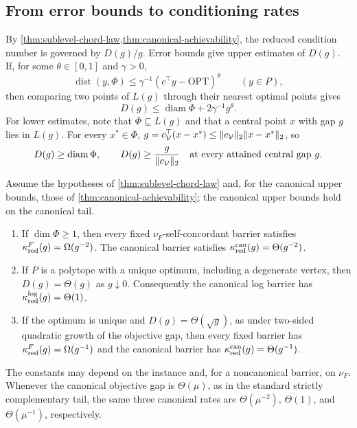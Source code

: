 \subsection{From error bounds to conditioning rates}
\label{sec:conditioning-dictionary}

By \cref{thm:sublevel-chord-law,thm:canonical-achievability}, the reduced
condition number is governed by $D(g)/g$.  Error bounds give upper estimates
of $D(g)$.  If, for some $\theta\in[0,1]$ and $\gamma>0$,
\begin{equation}
 \operatorname{dist}(y,\Phi)\leq\gamma^{-1}
       (c^\top y-\mathrm{OPT})^\theta\qquad(y\in P),
 \label{eq:holder-error-bound}
\end{equation}
then comparing two points of $L(g)$ through their nearest optimal points
gives
\begin{equation}
 D(g)\leq\operatorname{diam}\Phi+2\gamma^{-1}g^\theta.
 \label{eq:diameter-from-error-bound}
\end{equation}
For lower estimates, note that $\Phi\subseteq L(g)$ and that a central
point $x$ with gap $g$ lies in $L(g)$.  For every $x^*\in\Phi$,
$g=c_{\mathcal V}^\top(x-x^*)\leq
\lVert c_{\mathcal V}\rVert_2\lVert x-x^*\rVert_2$, so
\begin{equation}
 D(g)\geq\operatorname{diam}\Phi,
 \qquad
 D(g)\geq\frac g{\lVert c_{\mathcal V}\rVert_2}
 \quad\text{at every attained central gap }g.
 \label{eq:diameter-lower-basics}
\end{equation}

\begin{corollary}
\label{cor:conditioning-regimes}
Assume the hypotheses of \cref{thm:sublevel-chord-law} and, for the
canonical upper bounds, those of \cref{thm:canonical-achievability}; the
canonical upper bounds hold on the canonical tail.
\begin{enumerate}[label=\textup{(\roman*)}]
 \item If $\dim\Phi\geq1$, then every fixed $\nu_F$-self-concordant barrier
 satisfies $\kappa_{\rm red}^{F}(g)=\Omega(g^{-2})$.  The canonical barrier
 satisfies $\kappa_{\rm red}^{\rm can}(g)=\Theta(g^{-2})$.
 \item If $P$ is a polytope with a unique optimum, including a degenerate
 vertex, then $D(g)=\Theta(g)$ as $g\downarrow0$.  Consequently the canonical
 log barrier has $\kappa_{\rm red}^{\log}(g)=\Theta(1)$.
 \item If the optimum is unique and $D(g)=\Theta(\sqrt g)$, as under two-sided
 quadratic growth of the objective gap, then every fixed barrier has
 $\kappa_{\rm red}^{F}(g)=\Omega(g^{-1})$ and the canonical barrier has
 $\kappa_{\rm red}^{\rm can}(g)=\Theta(g^{-1})$.
\end{enumerate}
The constants may depend on the instance and, for a noncanonical barrier, on
$\nu_F$.  Whenever the canonical objective gap is $\Theta(\mu)$, as in the
standard strictly complementary tail, the same three canonical rates are
$\Theta(\mu^{-2})$, $\Theta(1)$, and $\Theta(\mu^{-1})$, respectively.
\end{corollary}

